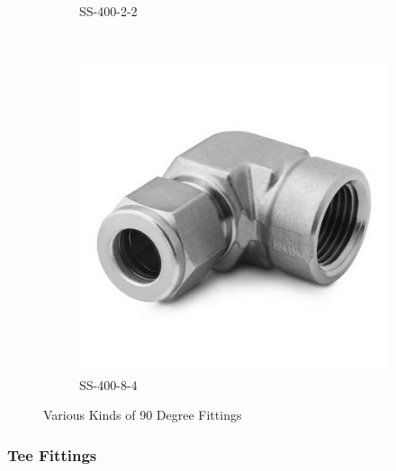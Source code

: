 \begin{figure}[H]
\begin{subfigure}[b]{0.2\textwidth}
    \caption{SS-400-2-2}
    \end{subfigure}
    ~
    \begin{subfigure}[b]{0.2\textwidth}
    \centering
    \includegraphics[width=\textwidth]{appendix/img/interfaces/SS-400-8-4.jpg}
    \caption{SS-400-8-4}
    \end{subfigure}
    \caption{Various Kinds of 90 Degree Fittings}
    \label{Appx:Elbow_fittings}
\end{figure}


\subsubsection{Tee Fittings}

